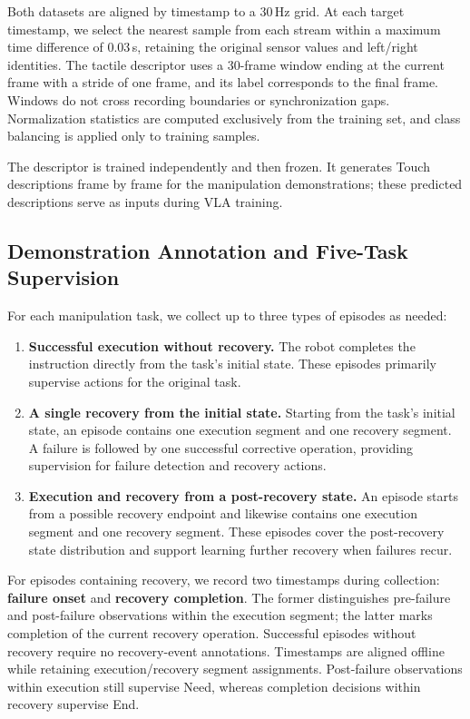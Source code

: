 Both datasets are aligned by timestamp to a 30\,Hz grid. At each target timestamp, we select the nearest sample from each stream within a maximum time difference of 0.03\,s, retaining the original sensor values and left/right identities. The tactile descriptor uses a 30-frame window ending at the current frame with a stride of one frame, and its label corresponds to the final frame. Windows do not cross recording boundaries or synchronization gaps. Normalization statistics are computed exclusively from the training set, and class balancing is applied only to training samples.

The descriptor is trained independently and then frozen. It generates Touch descriptions frame by frame for the manipulation demonstrations; these predicted descriptions serve as inputs during VLA training.

\subsection{Demonstration Annotation and Five-Task Supervision}
\label{sec:app_demonstration_supervision}

For each manipulation task, we collect up to three types of episodes as needed:
\begin{enumerate}
    \item \textbf{Successful execution without recovery.} The robot completes the instruction directly from the task's initial state. These episodes primarily supervise actions for the original task.
    \item \textbf{A single recovery from the initial state.} Starting from the task's initial state, an episode contains one execution segment and one recovery segment. A failure is followed by one successful corrective operation, providing supervision for failure detection and recovery actions.
    \item \textbf{Execution and recovery from a post-recovery state.} An episode starts from a possible recovery endpoint and likewise contains one execution segment and one recovery segment. These episodes cover the post-recovery state distribution and support learning further recovery when failures recur.
\end{enumerate}

For episodes containing recovery, we record two timestamps during collection: \textbf{failure onset} and \textbf{recovery completion}. The former distinguishes pre-failure and post-failure observations within the execution segment; the latter marks completion of the current recovery operation. Successful episodes without recovery require no recovery-event annotations. Timestamps are aligned offline while retaining execution/recovery segment assignments. Post-failure observations within execution still supervise Need, whereas completion decisions within recovery supervise End.

